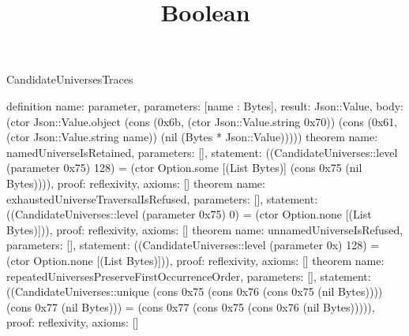 \begin{lexlean}{CandidateUniversesTraces}
\title{Boolean}
\begin{semanticmodule}
definition{
 name: parameter,
 parameters: [name : Bytes],
 result: Json::Value,
 body: (ctor Json::Value.object (cons (0x6b, (ctor Json::Value.string 0x70)) (cons (0x61, (ctor Json::Value.string name)) (nil (Bytes * Json::Value)))))
}
theorem{
 name: namedUniverseIsRetained,
 parameters: [],
 statement: ((CandidateUniverses::level (parameter 0x75) 128) = (ctor Option.some [(List Bytes)] (cons 0x75 (nil Bytes)))),
 proof: reflexivity{},
 axioms: []
}
theorem{
 name: exhaustedUniverseTraversalIsRefused,
 parameters: [],
 statement: ((CandidateUniverses::level (parameter 0x75) 0) = (ctor Option.none [(List Bytes)])),
 proof: reflexivity{},
 axioms: []
}
theorem{
 name: unnamedUniverseIsRefused,
 parameters: [],
 statement: ((CandidateUniverses::level (parameter 0x) 128) = (ctor Option.none [(List Bytes)])),
 proof: reflexivity{},
 axioms: []
}
theorem{
 name: repeatedUniversesPreserveFirstOccurrenceOrder,
 parameters: [],
 statement: ((CandidateUniverses::unique (cons 0x75 (cons 0x76 (cons 0x75 (nil Bytes)))) (cons 0x77 (nil Bytes))) = (cons 0x77 (cons 0x75 (cons 0x76 (nil Bytes))))),
 proof: reflexivity{},
 axioms: []
}
\end{semanticmodule}
\end{lexlean}

